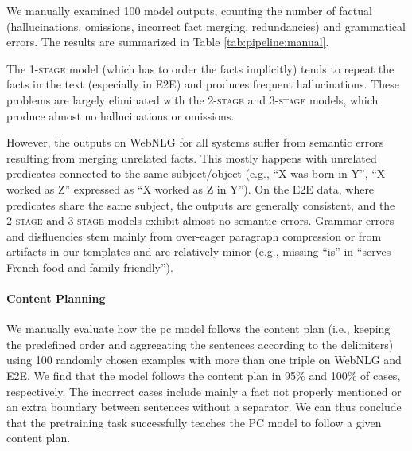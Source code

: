 We manually examined 100 model outputs, counting the number of factual (hallucinations, omissions, incorrect fact merging, redundancies) and grammatical errors. The results are summarized in Table \ref{tab:pipeline:manual}.

The \textsc{1-stage} model (which has to order the facts implicitly) tends to repeat the facts in the text (especially in E2E) and produces frequent hallucinations. These problems are largely eliminated with the \textsc{2-stage} and \textsc{3-stage} models, which produce almost no hallucinations or omissions.

However, the outputs on WebNLG for all systems suffer from semantic errors resulting from merging unrelated facts. This mostly happens with unrelated predicates connected to the same subject/object (e.g., ``X was born in Y'', ``X worked as Z'' expressed as ``X worked as Z in Y''). On the E2E data, where predicates share the same subject, the outputs are generally consistent, and the \textsc{2-stage} and \textsc{3-stage} models exhibit almost no semantic errors. Grammar errors and disfluencies stem mainly from over-eager paragraph compression or from artifacts in our templates and are relatively minor (e.g., missing ``is'' in ``serves French food and family-friendly'').


\paragraph{Content Planning} We manually evaluate how the \ac{pc} model follows the content plan (i.e., keeping the predefined order and aggregating the sentences according to the delimiters) using 100 randomly chosen examples with more than one triple on WebNLG and E2E. We find that the model follows the content plan in 95\% and 100\% of cases, respectively. The incorrect cases include mainly a fact not properly mentioned or an extra boundary between sentences without a separator. We can thus conclude that the pretraining task successfully teaches the PC model to follow a given content plan.



